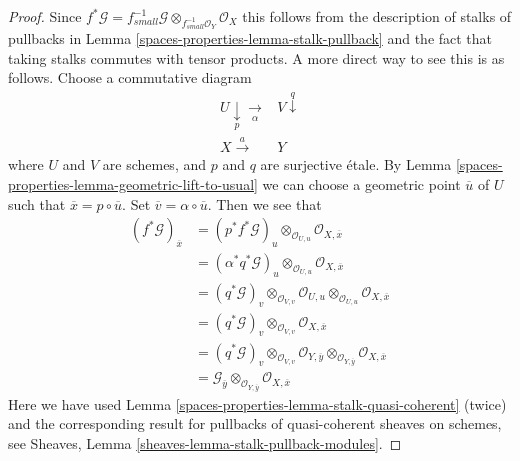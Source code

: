 \begin{proof}
Since $f^*\mathcal{G} =
f_{small}^{-1}\mathcal{G} \otimes_{f_{small}^{-1}\mathcal{O}_Y} \mathcal{O}_X$
this follows from the description of stalks of pullbacks in
Lemma \ref{spaces-properties-lemma-stalk-pullback}
and the fact that taking stalks commutes with tensor products.
A more direct way to see this is as follows.
Choose a commutative diagram
$$
\begin{array}{cc}U \underset{p}{\downarrow}\underset{\alpha}{\longrightarrow} & V \overset{q}{\downarrow} \\ X \overset{a}{\longrightarrow} & Y\end{array}
$$
where $U$ and $V$ are schemes, and $p$ and $q$ are surjective \'etale.
By
Lemma \ref{spaces-properties-lemma-geometric-lift-to-usual}
we can choose a geometric point $\overline{u}$ of $U$ such that
$\overline{x} = p \circ \overline{u}$. Set
$\overline{v} = \alpha \circ \overline{u}$.
Then we see that
\begin{align*}
(f^*\mathcal{G})_{\overline{x}} & =
(p^*f^*\mathcal{G})_u \otimes_{\mathcal{O}_{U, u}}
\mathcal{O}_{X, \overline{x}} \\
& = (\alpha^*q^*\mathcal{G})_u \otimes_{\mathcal{O}_{U, u}}
\mathcal{O}_{X, \overline{x}} \\
& = (q^*\mathcal{G})_v \otimes_{\mathcal{O}_{V, v}}
\mathcal{O}_{U, u} \otimes_{\mathcal{O}_{U, u}}
\mathcal{O}_{X, \overline{x}} \\
& = (q^*\mathcal{G})_v \otimes_{\mathcal{O}_{V, v}}
\mathcal{O}_{X, \overline{x}} \\
& = (q^*\mathcal{G})_v \otimes_{\mathcal{O}_{V, v}}
\mathcal{O}_{Y, \overline{y}} \otimes_{\mathcal{O}_{Y, \overline{y}}}
\mathcal{O}_{X, \overline{x}} \\
& = \mathcal{G}_{\overline{y}} \otimes_{\mathcal{O}_{Y, \overline{y}}}
\mathcal{O}_{X, \overline{x}}
\end{align*}
Here we have used
Lemma \ref{spaces-properties-lemma-stalk-quasi-coherent} (twice)
and the corresponding result for pullbacks of quasi-coherent sheaves
on schemes, see
Sheaves, Lemma \ref{sheaves-lemma-stalk-pullback-modules}.
\end{proof}

